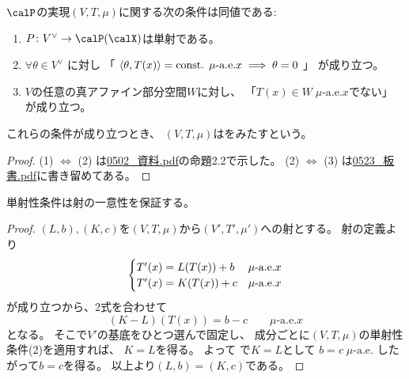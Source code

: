 \documentclass[report]{jlreq}
\begin{document}
\begin{propdef}[単射性条件]
    $\calP$の実現$(V, T, \mu)$に関する次の条件は同値である:
    \begin{enumerate}
        \item $P \colon V^\vee \to \calP(\calX)$は単射である。
        \item $\forall \theta \in V^\vee$
            に対し
            「
                $\left\langle{\theta},{T(x)}\right\rangle = \text{const. $\mu$-a.e.$x$}
                \implies
                \theta = 0$
            」
            が成り立つ。
        \item $V$の任意の真アファイン部分空間$W$に対し、
            「$T(x) \in W \; \text{$\mu$-a.e.$x$}$でない」
            が成り立つ。
    \end{enumerate}
    これらの条件が成り立つとき、
    $(V, T, \mu)$はをみたすという。
\end{propdef}

\begin{proof}
    (1) $\iff$ (2) は\url{0502_資料.pdf}の命題2.2で示した。
    (2) $\iff$ (3) は\url{0523_板書.pdf}に書き留めてある。
\end{proof}

単射性条件は射の一意性を保証する。


\begin{proof}
    $(L, b), (K, c)$を$(V, T, \mu)$から$(V', T', \mu')$への射とする。
    射の定義より
    \begin{equation}
        \begin{cases}
            T'(x) = L(T(x)) + b & \text{$\mu$-a.e.$x$} \\
            T'(x) = K(T(x)) + c & \text{$\mu$-a.e.$x$}
        \end{cases}
        \locallabel{eq:1}
    \end{equation}
    が成り立つから、2式を合わせて
    \begin{equation}
        (K - L)(T(x)) = b - c \qquad \text{$\mu$-a.e.$x$}
    \end{equation}
    となる。
    そこで$V'$の基底をひとつ選んで固定し、
    成分ごとに$(V, T, \mu)$の単射性条件(2)を適用すれば、
    $K = L$を得る。
    よって
    で$K = L$として
    $b = c \; \text{$\mu$-a.e.}$
    したがって$b = c$を得る。
    以上より$(L, b) = (K, c)$である。
\end{proof}
\end{document}
